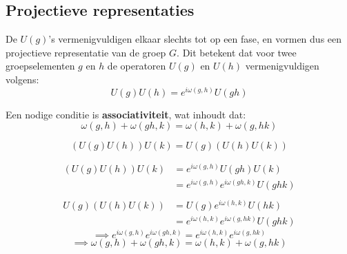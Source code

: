 \subsection{Projectieve representaties}
De \(U(g)\)'s vermenigvuldigen elkaar slechts tot op een fase, en vormen dus een projectieve representatie van de groep \(G\).
 Dit betekent dat voor twee groepselementen \(g\) en \(h\) de operatoren \(U(g)\) en \(U(h)\) vermenigvuldigen volgens:
    \[
        U(g)U(h) = e^{i\omega(g,h)}U(gh)
    \]

Een nodige conditie is \textbf{associativiteit}, wat inhoudt dat:
    \[
        \omega(g,h) + \omega(gh,k) = \omega(h,k) + \omega(g,hk)
    \]

\begin{derivation}
    \[(U(g)U(h))U(k) = U(g)(U(h)U(k)) \]

\begin{align*}
   (U(g)U(h))U(k) &= e^{i\omega(g,h)}U(gh)U(k) \\
    &= e^{i\omega(g,h)}e^{i\omega(gh,k)}U(ghk) \\
\end{align*}
\begin{align*}
    U(g)(U(h)U(k)) &= U(g)e^{i\omega(h,k)}U(hk) \\
    &= e^{i\omega(h,k)}e^{i\omega(g,hk)}U(ghk)
\end{align*}
\[
\implies e^{i\omega(g,h)}e^{i\omega(gh,k)} = e^{i\omega(h,k)}e^{i\omega(g,hk)}
\]
\[
    \implies \omega(g,h) + \omega(gh,k) = \omega(h,k) + \omega(g,hk)
\]
\end{derivation}